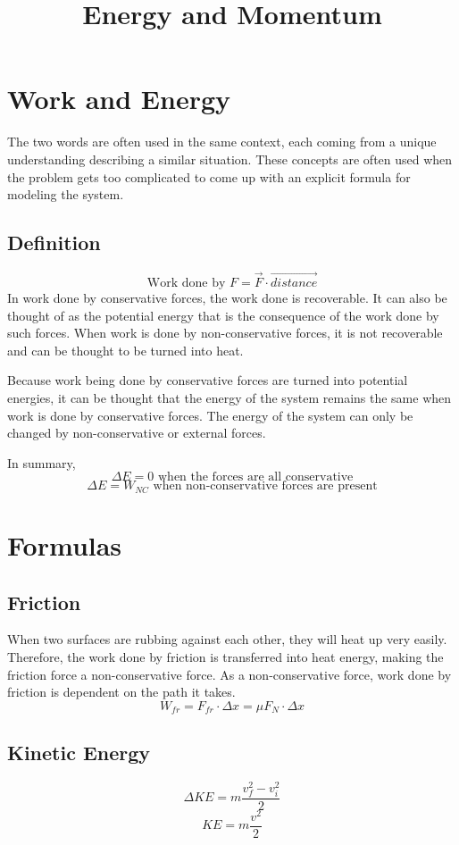 \documentclass[]{article}
\title{Energy and Momentum}
\author{}
\begin{document}
\maketitle
\section{Work and Energy}
The two words are often used in the same context, each coming from a unique understanding describing a similar situation. These concepts are often used when the problem gets too complicated to come up with an explicit formula for modeling the system.

\subsection{Definition}
	$$\text{Work done by } F = \vec{F} \cdot \vec{distance}$$
	In work done by conservative forces, the work done is recoverable. It can also be thought of as the potential energy that is the consequence of the work done by such forces.
	When work is done by non-conservative forces, it is not recoverable and can be thought to be turned into heat. 

	Because work being done by conservative forces are turned into potential energies, it can be thought that the energy of the system remains the same when work is done by conservative forces. The energy of the system can only be changed by non-conservative or external forces.
	
	In summary,
	$$\Delta E = 0 \text{ when the forces are all conservative}$$
	$$\Delta E = W_{NC} \text{ when non-conservative forces are present}$$ 
\section{Formulas}	
	\subsection{Friction}
	When two surfaces are rubbing against each other, they will heat up very easily. Therefore, the work done by friction is transferred into heat energy, making the friction force a non-conservative force. As a non-conservative force, work done by friction is dependent on the path it takes. 
	$$W_{fr} = F_{fr}\cdot \Delta x = \mu F_N \cdot \Delta x$$

	\subsection{Kinetic Energy}
	$$\Delta KE = m \frac{v_f^2 - v^2_i}{2}$$
	$$KE = m\frac{v^2}{2}$$
\end{document}
